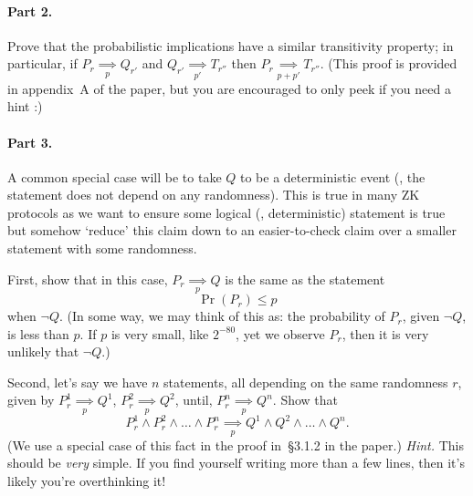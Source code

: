 \documentclass[12pt,hidelinks]{article}
\newcommand{\impliesn}[1]{\underset{#1}{\implies}}
\newcommand{\impliesp}{\impliesn{p}}
\newcommand{\impliespp}{\impliesn{p'}}
\begin{document}
\paragraph{Part 2.} Prove that the probabilistic implications have a similar
transitivity property; in particular, if $P_r \impliesp Q_{r'}$ and $Q_{r'}
\impliespp T_{r''}$ then $P_r \impliesn{p + p'} T_{r''}$. (This proof is
provided in appendix~A of the paper, but you are encouraged to only peek if you
need a hint :)

\paragraph{Part 3.} A common special case will be to take $Q$ to be a
deterministic event (\ie, the statement does not depend on any randomness).
This is true in many ZK protocols as we want to ensure some logical (\ie,
deterministic) statement is true but somehow `reduce' this claim down to an
easier-to-check claim over a smaller statement with some randomness.

First, show that in this case, $P_r \impliesp Q$ is the same as the statement
\[
    \Pr(P_r) \le p
\]
when $\neg Q$. (In some way, we may think of this as: the probability of $P_r$,
given $\neg Q$, is less than $p$. If $p$ is very small, like $2^{-80}$, yet we
observe $P_r$, then it is very unlikely that $\neg Q$.)

Second, let's say we have $n$ statements, all depending on the same randomness
$r$, given by $P_r^1 \impliesp Q^1$, $P_r^2 \impliesp Q^2$, until, $P_r^n
\impliesp Q^n$. Show that
\[
    P_r^1 \wedge P_r^2 \wedge \dots \wedge P_r^n \impliesp Q^1 \wedge Q^2 \wedge \dots \wedge Q^n.
\]
(We use a special case of this fact in the proof in~\S3.1.2 in the paper.)
\emph{Hint.} This should be \emph{very} simple. If you find yourself writing more
than a few lines, then it's likely you're overthinking it!
\end{document}
